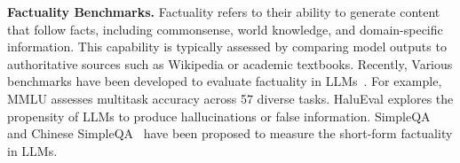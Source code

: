 


\noindent\textbf{Factuality Benchmarks.}
Factuality refers to their ability to generate content that follow facts, including commonsense, world knowledge, and domain-specific information. This capability is typically assessed by comparing model outputs to authoritative sources such as Wikipedia or academic textbooks.
Recently,
Various benchmarks have been developed to evaluate factuality in LLMs~\citep{zhong2023agieval,huang2023ceval,li2023cmmlu,BigBench,hotpotqa,TruthfulQA,codearena,execrepobench,tan2024chinesesafetyqasafetyshortform}.
For example,
MMLU \citep{mmlu} assesses multitask accuracy across 57 diverse tasks.
HaluEval \citep{li2023halueval} explores the propensity of LLMs to produce hallucinations or false information.
 SimpleQA~\citep{Wei2024MeasuringSF} and Chinese SimpleQA~\citep{he2024chinesesimpleqachinesefactuality} have been proposed to measure the short-form factuality in LLMs.

